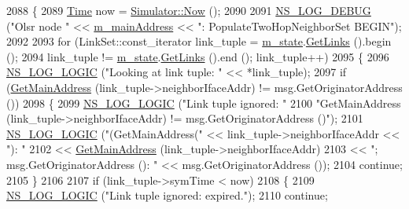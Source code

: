 \begin{DoxyCode}
2088 \{
2089   \hyperlink{namespacens3_1_1TracedValueCallback_a7ffd3e7c142ffe7c8a1d2db9b8de38ec}{Time} now = \hyperlink{classns3_1_1Simulator_ac3178fa975b419f7875e7105be122800}{Simulator::Now} ();
2090 
2091   \hyperlink{group__logging_ga413f1886406d49f59a6a0a89b77b4d0a}{NS\_LOG\_DEBUG} (\textcolor{stringliteral}{"Olsr node "} << \hyperlink{classns3_1_1olsr_1_1RoutingProtocol_a58cc50ed5d1039aab603e90e318aabfb}{m\_mainAddress} << \textcolor{stringliteral}{": PopulateTwoHopNeighborSet
       BEGIN"});
2092 
2093   \textcolor{keywordflow}{for} (LinkSet::const\_iterator link\_tuple = \hyperlink{classns3_1_1olsr_1_1RoutingProtocol_a07942ec1a7df71b609c8d2ff3b567c49}{m\_state}.\hyperlink{classns3_1_1olsr_1_1OlsrState_a1d8f1a95165973f05e3fd1ff0d76fbda}{GetLinks} ().begin ();
2094        link\_tuple != \hyperlink{classns3_1_1olsr_1_1RoutingProtocol_a07942ec1a7df71b609c8d2ff3b567c49}{m\_state}.\hyperlink{classns3_1_1olsr_1_1OlsrState_a1d8f1a95165973f05e3fd1ff0d76fbda}{GetLinks} ().end (); link\_tuple++)
2095     \{
2096       \hyperlink{group__logging_ga88acd260151caf2db9c0fc84997f45ce}{NS\_LOG\_LOGIC} (\textcolor{stringliteral}{"Looking at link tuple: "} << *link\_tuple);
2097       \textcolor{keywordflow}{if} (\hyperlink{classns3_1_1olsr_1_1RoutingProtocol_ae01451170fb389d322b33ed6d954f460}{GetMainAddress} (link\_tuple->neighborIfaceAddr) != msg.GetOriginatorAddress ())
2098         \{
2099           \hyperlink{group__logging_ga88acd260151caf2db9c0fc84997f45ce}{NS\_LOG\_LOGIC} (\textcolor{stringliteral}{"Link tuple ignored: "}
2100                         \textcolor{stringliteral}{"GetMainAddress (link\_tuple->neighborIfaceAddr) != msg.GetOriginatorAddress ()"});
2101           \hyperlink{group__logging_ga88acd260151caf2db9c0fc84997f45ce}{NS\_LOG\_LOGIC} (\textcolor{stringliteral}{"(GetMainAddress("} << link\_tuple->neighborIfaceAddr << \textcolor{stringliteral}{"): "}
2102                                            << \hyperlink{classns3_1_1olsr_1_1RoutingProtocol_ae01451170fb389d322b33ed6d954f460}{GetMainAddress} (link\_tuple->neighborIfaceAddr)
2103                                            << \textcolor{stringliteral}{"; msg.GetOriginatorAddress (): "} << msg.GetOriginatorAddress
       ());
2104           \textcolor{keywordflow}{continue};
2105         \}
2106 
2107       \textcolor{keywordflow}{if} (link\_tuple->symTime < now)
2108         \{
2109           \hyperlink{group__logging_ga88acd260151caf2db9c0fc84997f45ce}{NS\_LOG\_LOGIC} (\textcolor{stringliteral}{"Link tuple ignored: expired."});
2110           \textcolor{keywordflow}{continue};

\end{DoxyCode}
